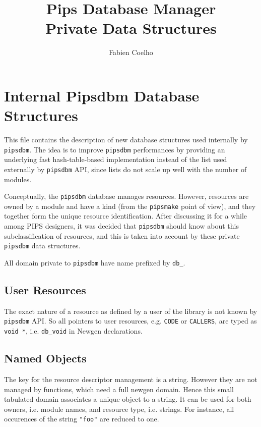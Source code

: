 \documentclass[a4paper]{article}
\title{Pips Database Manager \\ Private Data Structures}
\author{Fabien Coelho}
\begin{document}
\maketitle

\section{Internal Pipsdbm Database Structures}
\label{sec:new}

This file contains the description of new database structures used
internally by \texttt{pipsdbm}. The idea is to improve
\texttt{pipsdbm} performances by providing an underlying fast
hash-table-based implementation instead of the list used externally by
\verb/pipsdbm/ API, since lists do not scale up well with the number of
modules.

Conceptually, the \verb/pipsdbm/ database manages resources. However,
resources are owned by a module and have a kind (from the
\texttt{pipsmake} point of view), and they together form the unique
resource identification. After discussing it for a while among PIPS
designers, it was decided that \texttt{pipsdbm} should know about this
subclassification of resources, and this is taken into account by
these private \verb/pipsdbm/ data structures.

All domain private to \verb/pipsdbm/ have name prefixed by \verb/db_/.

\subsection{User Resources}

The exact nature of a resource as defined by a user of the library is
not known by \verb/pipsdbm/ API. So all pointers to user resources,
e.g. \verb/CODE/ or \verb/CALLERS/, are typed as \verb/void */,
i.e. \verb/db_void/ in Newgen declarations.


\subsection{Named Objects}
\label{sec:named}

The key for the resource descriptor management is a string. However
they are not managed by functions, which need a full newgen
domain. 
Hence this small tabulated domain associates a unique object
to a string. It can be used for both owners, i.e. module names, and
resource type, i.e. strings. For instance, all occurences of the
string \verb/"foo"/ are reduced to one.
\end{document}
